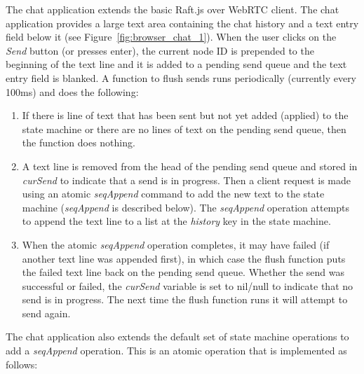\documentclass[conference,compsoc]{./IEEEtran/IEEEtran}
\begin{document}
The chat application extends the basic Raft.js over WebRTC client. The
chat application provides a large text area containing the chat
history and a text entry field below it
(see Figure~\ref{fig:browser_chat_1}). When the user clicks on the
\emph{Send} button (or presses enter), the current node ID is
prepended to the beginning of the text line and it is added to
a pending send queue and the text entry field is blanked. A function
to flush sends runs periodically (currently every 100ms) and does the
following:

\begin{enumerate}
\item If there is line of text that has been sent but not yet
    added (applied) to the state machine or there are no lines of text
    on the pending send queue, then the function does nothing.
\item A text line is removed from the head of the pending send queue
    and stored in \emph{curSend} to indicate that a send is in
    progress. Then a client request is made using an atomic
    \emph{seqAppend} command to add the new text to the state machine
    (\emph{seqAppend} is described below).  The \emph{seqAppend}
    operation attempts to append the text line to a list at the
    \emph{history} key in the state machine.
\item When the atomic \emph{seqAppend} operation completes, it may
    have failed (if another text line was appended first), in which
    case the flush function puts the failed text line back on the
    pending send queue. Whether the send was successful or failed, the
    \emph{curSend} variable is set to nil/null to indicate that no
    send is in progress. The next time the flush function runs it will
    attempt to send again. %
\end{enumerate}


The chat application also extends the default set of state machine
operations to add a \emph{seqAppend} operation. This is an atomic
operation that is implemented as follows:
\end{document}
